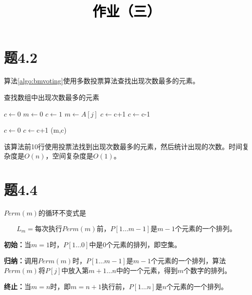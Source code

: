 \documentclass[a4paper,twoside]{article}
\newcommand{\PaperTitle}{作业（三）}  %
\begin{document}
\newpage

\title{
	\Large{\textcolor{black}{\PaperTitle}}
}
	
	
\maketitle
	
\tableofcontents
 
\newpage
\begin{spacing}{1.2}

\section{题4.2}
算法\ref{algo:bmvoting}使用多数投票算法查找出现次数最多的元素。
\begin{algorithm}
	\caption{查找数组中出现次数最多的元素}
	\label{algo:bmvoting}
	\begin{algorithmic}[1]
		\State $c \gets 0$
		\State $m \gets 0$
		\State $c \gets 1$
		\State $m \gets A[j]$
		\EndIf
		\State $c \gets $c+1
		\Else
		\State $c \gets $c-1
		\EndIf
		\EndFor
		
		\State $c \gets 0$
		\State $c \gets $c+1
		\EndIf
		\EndFor
		\Return (m,c)
		\EndProcedure
		
	\end{algorithmic}
\end{algorithm}	

该算法前10行使用投票法找到出现次数最多的元素，然后统计出现的次数。时间复杂度是$O(n)$，空间复杂度是$O(1)$。


\section{题4.4}

$Perm(m)$的循环不变式是

$$
L_m=\mbox{每次执行$Perm(m)$前，$P[1\dots m-1]$是$m-1$个元素的一个排列。}
$$

\textbf{初始：}当$m=1$时，$P[1\dots 0]$中是0个元素的排列，即空集。

\textbf{归纳：}调用$Perm(m)$时，$P[1\dots m-1]$是$m-1$个元素的一个排列，算法$Perm(m)$将$P[j]$中放入第$m+1\dots n$中的一个元素，得到$m$个数字的排列。

\textbf{终止：}当$m=n$时，即$m=n+1$执行前，$P[1\dots n]$是$n$个元素的一个排列。


\end{spacing}
\end{document}
